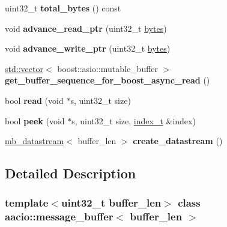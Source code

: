 \begin{DoxyCompactItemize}
\item 
\mbox{\label{classaacio_1_1message__buffer_a88dbdb46f6d174facba253a3634b498d}} 
uint32\+\_\+t {\bfseries total\+\_\+bytes} () const
\item 
\mbox{\label{classaacio_1_1message__buffer_a489f4eca077af8dbe5a83d521aa03815}} 
void {\bfseries advance\+\_\+read\+\_\+ptr} (uint32\+\_\+t \mbox{\hyperlink{classstd_1_1vector}{bytes}})
\item 
\mbox{\label{classaacio_1_1message__buffer_adc0b01b5768f1cb56bdced49ad3c44fb}} 
void {\bfseries advance\+\_\+write\+\_\+ptr} (uint32\+\_\+t \mbox{\hyperlink{classstd_1_1vector}{bytes}})
\item 
\mbox{\label{classaacio_1_1message__buffer_a4b3d18af95276f3f4c0960f0b84db0a9}} 
\mbox{\hyperlink{classstd_1_1vector}{std\+::vector}}$<$ boost\+::asio\+::mutable\+\_\+buffer $>$ {\bfseries get\+\_\+buffer\+\_\+sequence\+\_\+for\+\_\+boost\+\_\+async\+\_\+read} ()
\item 
\mbox{\label{classaacio_1_1message__buffer_a240ab1b512dcd3543594dfdcf2258980}} 
bool {\bfseries read} (void $\ast$s, uint32\+\_\+t size)
\item 
\mbox{\label{classaacio_1_1message__buffer_a15fb47748ad647f52f1d60ecf8a2ee61}} 
bool {\bfseries peek} (void $\ast$s, uint32\+\_\+t size, \mbox{\hyperlink{structindex__t}{index\+\_\+t}} \&index)
\item 
\mbox{\label{classaacio_1_1message__buffer_aac091210ed9e7f88d423a486702dc179}} 
\mbox{\hyperlink{classaacio_1_1mb__datastream}{mb\+\_\+datastream}}$<$ buffer\+\_\+len $>$ {\bfseries create\+\_\+datastream} ()
\end{DoxyCompactItemize}


\subsection{Detailed Description}
\subsubsection*{template$<$uint32\+\_\+t buffer\+\_\+len$>$\newline
class aacio\+::message\+\_\+buffer$<$ buffer\+\_\+len $>$}

